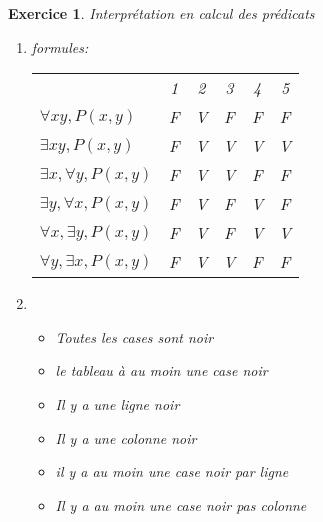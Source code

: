 \documentclass{article}
\theoremstyle{plain}
\newtheorem{exo}{Exercice}%
\begin{document}
\begin{exo} Interprétation en calcul des prédicats

    \begin{enumerate}
        \item formules: \\
        \begin{tabular}{l c c c c c}
                                                & 1 & 2 & 3 & 4 & 5 \\
            $\forall x y, P(x, y)$              & F & V & F & F & F \\
            $\exists x y, P(x, y)$              & F & V & V & V & V \\
            $\exists  x, \forall y, P(x, y)$    & F & V & V & F & F \\
            $\exists  y, \forall x, P(x, y)$    & F & V & F & V & F \\
            $\forall  x, \exists y, P(x, y)$    & F & V & F & V & V \\
            $\forall  y, \exists x, P(x, y)$    & F & V & V & F & F \\
        \end{tabular}

        \item 
        \begin{itemize}
            \item Toutes les cases sont noir
            \item le tableau à au moin une case noir
            \item Il y a une ligne noir
            \item Il y a une colonne noir
            \item il y a au moin une case noir par ligne
            \item Il y a au moin une case noir pas colonne
        \end{itemize}
    \end{enumerate}
\end{exo}
\end{document}
